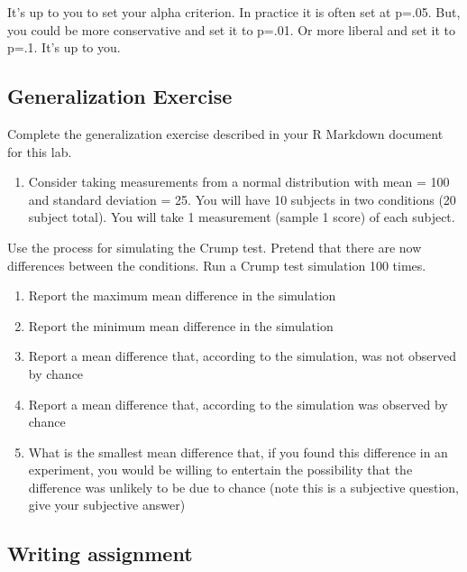 \documentclass[
]{book}
\providecommand{\tightlist}{%
  \setlength{\itemsep}{0pt}\setlength{\parskip}{0pt}}
\begin{document}
It's up to you to set your alpha criterion. In practice it is often set at p=.05. But, you could be more conservative and set it to p=.01. Or more liberal and set it to p=.1. It's up to you.

\hypertarget{generalization-exercise-4}{%
\subsection{Generalization Exercise}\label{generalization-exercise-4}}

Complete the generalization exercise described in your R Markdown document for this lab.

\begin{enumerate}
\def\labelenumi{\arabic{enumi}.}
\tightlist
\item
  Consider taking measurements from a normal distribution with mean = 100 and standard deviation = 25. You will have 10 subjects in two conditions (20 subject total). You will take 1 measurement (sample 1 score) of each subject.
\end{enumerate}

Use the process for simulating the Crump test. Pretend that there are now differences between the conditions. Run a Crump test simulation 100 times.

\begin{enumerate}
\def\labelenumi{\alph{enumi}.}
\tightlist
\item
  Report the maximum mean difference in the simulation
\item
  Report the minimum mean difference in the simulation
\item
  Report a mean difference that, according to the simulation, was not observed by chance
\item
  Report a mean difference that, according to the simulation was observed by chance
\item
  What is the smallest mean difference that, if you found this difference in an experiment, you would be willing to entertain the possibility that the difference was unlikely to be due to chance (note this is a subjective question, give your subjective answer)
\end{enumerate}

\hypertarget{writing-assignment-4}{%
\subsection{Writing assignment}\label{writing-assignment-4}}
\end{document}
